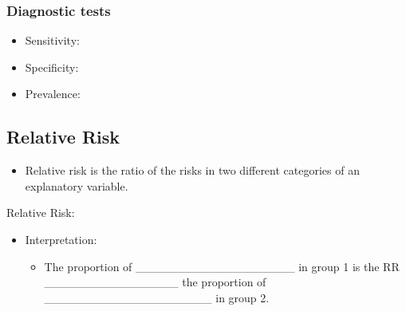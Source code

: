 \documentclass[
]{report}
\providecommand{\tightlist}{%
  \setlength{\itemsep}{0pt}\setlength{\parskip}{0pt}}
\begin{document}
\vspace{1in}

\hypertarget{diagnostic-tests}{%
\subsubsection*{Diagnostic tests}\label{diagnostic-tests}}

\begin{itemize}
\tightlist
\item
  Sensitivity:
\end{itemize}

\vspace{0.3in}

\begin{itemize}
\tightlist
\item
  Specificity:
\end{itemize}

\vspace{0.3in}

\begin{itemize}
\tightlist
\item
  Prevalence:
\end{itemize}

\vspace{0.3in}

\hypertarget{relative-risk}{%
\subsection{Relative Risk}\label{relative-risk}}

\begin{itemize}
\tightlist
\item
  Relative risk is the ratio of the risks in two different categories of an explanatory variable.
\end{itemize}

Relative Risk:

\vspace{0.3in}


\begin{itemize}
\item
  Interpretation:

  \begin{itemize}
  \tightlist
  \item
    The proportion of \_\_\_\_\_\_\_\_\_\_\_\_\_\_\_\_\_\_\_ in group 1 is the RR \_\_\_\_\_\_\_\_\_\_\_\_\_\_\_\_ the proportion of \_\_\_\_\_\_\_\_\_\_\_\_\_\_\_\_\_\_\_\_ in group 2.
  \end{itemize}
\end{itemize}
\end{document}
